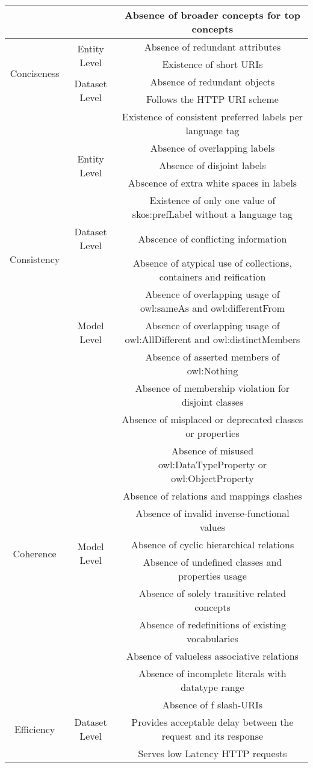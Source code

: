 \documentclass[onecolumn, crcready]{iosart2c}
\begin{document}
\begin{landscape}
\begin{center}
\begin{longtable}[h]{|c|c|c|}
\cline{3-3} 
 &  & Absence of broader concepts for top concepts\tabularnewline
\hline 
\hline 
\multirow{4}{*}{Conciseness} & \multirow{2}{*}{Entity Level} & Absence of redundant attributes\tabularnewline
\cline{3-3} 
 &  & Existence of short URIs\tabularnewline
\cline{2-3} 
 & \multirow{2}{*}{Dataset Level} & Absence of redundant objects\tabularnewline
\cline{3-3} 
 &  & Follows the HTTP URI scheme\tabularnewline
\hline 
\hline 
\multirow{11}{*}{Consistency} & \multirow{5}{*}{Entity Level} & Existence of consistent preferred labels per language tag\tabularnewline
\cline{3-3} 
 &  & Absence of overlapping labels\tabularnewline
\cline{3-3} 
 &  & Absence of disjoint labels\tabularnewline
\cline{3-3} 
 &  & Abscence of extra white spaces in labels\tabularnewline
\cline{3-3} 
 &  & Existence of only one value of skos:prefLabel without a language tag\tabularnewline
\cline{2-3} 
 & \multirow{1}{*}{Dataset Level} & Abscence of conflicting information\tabularnewline
\cline{2-3} 
 & \multirow{5}{*}{Model Level} & Absence of atypical use of collections, containers and reification\tabularnewline
\cline{3-3} 
 &  & Absence of overlapping usage of owl:sameAs and owl:differentFrom\tabularnewline
\cline{3-3} 
 &  & Absence of overlapping usage of owl:AllDifferent and owl:distinctMembers\tabularnewline
\cline{3-3} 
 &  & Absence of asserted members of owl:Nothing\tabularnewline
\cline{3-3} 
 &  & Absence of membership violation for disjoint classes\tabularnewline
\hline 
\hline 
\multirow{10}{*}{Coherence} & \multirow{10}{*}{Model Level} & Absence of misplaced or deprecated classes or properties\tabularnewline
\cline{3-3} 
 &  & Absence of misused owl:DataTypeProperty or owl:ObjectProperty\tabularnewline
\cline{3-3} 
 &  & Absence of relations and mappings clashes\tabularnewline
\cline{3-3} 
 &  & Absence of invalid inverse-functional values\tabularnewline
\cline{3-3} 
 &  & Absence of cyclic hierarchical relations\tabularnewline
\cline{3-3} 
 &  & Absence of undefined classes and properties usage\tabularnewline
\cline{3-3} 
 &  & Absence of solely transitive related concepts\tabularnewline
\cline{3-3} 
 &  & Absence of redefinitions of existing vocabularies\tabularnewline
\cline{3-3} 
 &  & Absence of valueless associative relations\tabularnewline
\cline{3-3} 
 &  & Absence of incomplete literals with datatype range\tabularnewline
\hline 
\hline 
\multirow{4}{*}{Efficiency} & \multirow{4}{*}{Dataset Level} & Absence of f slash-URIs\tabularnewline
\cline{3-3} 
 &  & Provides acceptable delay between the request and its response\tabularnewline
\cline{3-3} 
 &  & Serves low Latency HTTP requests\tabularnewline

\end{longtable}
\end{center}
\end{landscape}
\end{document}
